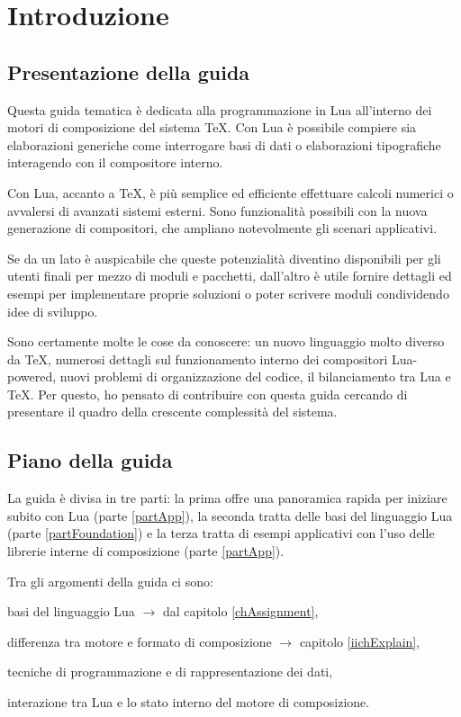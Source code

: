 

\chapter{Introduzione}

\section{Presentazione della guida}

Questa guida tematica è dedicata alla programmazione in Lua all'interno dei
motori di composizione del sistema \TeX. Con Lua è possibile compiere sia
elaborazioni generiche come interrogare basi di dati o elaborazioni tipografiche
interagendo con il compositore interno.

Con Lua, accanto a \TeX, è più semplice ed efficiente effettuare calcoli
numerici o avvalersi di avanzati sistemi esterni. Sono funzionalità possibili
con la nuova generazione di compositori, che ampliano notevolmente gli scenari
applicativi.

Se da un lato è auspicabile che queste potenzialità diventino disponibili per
gli utenti finali per mezzo di moduli e pacchetti, dall'altro è utile fornire
dettagli ed esempi per implementare proprie soluzioni o poter scrivere moduli
condividendo idee di sviluppo.

Sono certamente molte le cose da conoscere: un nuovo linguaggio molto diverso da
\TeX{}, numerosi dettagli sul funzionamento interno dei compositori Lua-powered,
nuovi problemi di organizzazione del codice, il bilanciamento tra Lua e \TeX.
Per questo, ho pensato di contribuire con questa guida cercando di presentare il
quadro della crescente complessità del sistema.


\section{Piano della guida}

La guida è divisa in tre parti: la prima offre una panoramica rapida per
iniziare subito con Lua (parte \ref{partApp}), la seconda tratta delle basi
del linguaggio Lua (parte \ref{partFoundation}) e la terza tratta di esempi
applicativi con l'uso delle librerie interne di composizione (parte
\ref{partApp}).

Tra gli argomenti della guida ci sono:
\begin{compactitemize}
\item basi del linguaggio Lua \( \to \) dal capitolo \ref{chAssignment},
\item differenza tra motore e formato di composizione \( \to \) capitolo
\ref{iichExplain},
\item tecniche di programmazione e di rappresentazione dei dati,
\item interazione tra Lua e lo stato interno del motore di composizione.
\end{compactitemize}


